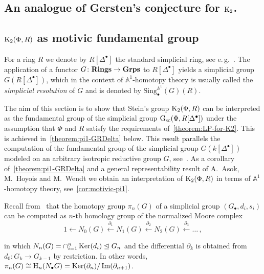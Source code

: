 \documentclass[oneside, 11pt]{amsart} \pdfoutput=1
\begin{document}
\subsection{An analogue of Gersten's conjecture for ${\mathrm{K}}_2$.}

\subsection{\texorpdfstring{${\mathrm{K}}_2(\Phi, R)$}{K2(R)} as motivic fundamental group}
For a ring $R$ we denote by $R[\Delta^\bullet]$ the standard simplicial ring, see e.\,g.~\cite{Jar83}. The application of a functor $G\colon{\normalfont\textbf{Rings}}\rightarrow{\normalfont\textbf{Grps}}$ to $R[\Delta^\bullet]$ yields a simplicial group $G(R[\Delta^\bullet])$, which in the context of $\mathbb{A}^1$-homotopy theory is usually called the {\it simplicial resolution} of $G$ and is denoted by $\mathrm{Sing}^{\mathbb{A}^1}_\bullet(G)(R)$.

The aim of this section is to show that Stein's group ${\mathrm{K}}_2(\Phi, R)$ can be interpreted as the fundamental group of the simplicial group $\mathrm{G}_\mathrm{sc}(\Phi, R[\Delta^\bullet])$ under the assumption that $\Phi$ and $R$ satisfy the requirements of~\cref{theorem:LP-for-K2}. This is achieved in~\cref{theorem:pi1-GRDelta} below. This result parallels the computation of the fundamental group of the simplicial group $G(k[\Delta^\bullet])$ modeled on an arbitrary isotropic reductive group $G$, see~\cite[Proposition~3.2]{VW16}. As a corollary of~\cref{theorem:pi1-GRDelta} and a general representability result of A.~Asok, M.~Hoyois and M.~Wendt we obtain an interpretation of ${\mathrm{K}}_2(\Phi, R)$ in terms of $\mathbb{A}^1$-homotopy theory, see~\cref{cor:motivic-pi1}.

Recall from~\cite[\S~17]{May67} that the homotopy group $\pi_n(G)$ of a simplicial group $(G_\bullet, d_i, s_i)$ can be computed as $n$-th homology group of the normalized Moore complex
\[
1 \leftarrow N_0(G) \xleftarrow{\partial_1} N_1(G) \xleftarrow{\partial_2} N_2(G) \xleftarrow{\partial_3} \ldots\,,
\]
\iffalse\[\begin{tikzcd} 1 & N_0(G) \ar[l] & N_1(G) \ar{l}[swap]{\partial_1} & N_2(G) \ar{l}[swap]{\partial_2} & \ar{l}[swap]{\partial_3} \ldots, \end{tikzcd} \] \fi
in which $N_n(G) = \cap_{i=1}^n\mathop{\mathrm{Ker}}\nolimits(d_i) \trianglelefteq G_n$ and the differential $\partial_k$ is obtained from $d_0\colon G_k \to G_{k-1}$ by restriction. In other words, $\pi_n(G) \cong \mathrm{H}_n(N_\bullet G) = \mathop{\mathrm{Ker}}\nolimits(\partial_n) / \mathop{\mathrm{Im}}\nolimits(\partial_{n+1})$.
\end{document}
